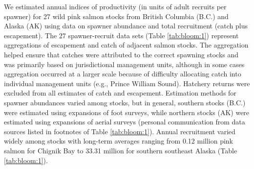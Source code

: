 We estimated annual indices of productivity (in units of adult recruits per
spawner) for 27 wild pink salmon stocks from British Columbia (B.C.) and Alaska
(AK) using data on spawner abundance and total recruitment (catch plus
escapement). The 27 spawner-recruit data sets (Table \ref{tab:bloom:1})
represent aggregations of escapement and catch of adjacent salmon stocks. The
aggregation helped ensure that catches were attributed to the correct spawning
stocks and was primarily based on jurisdictional management units, although in
some cases aggregation occurred at a larger scale because of difficulty
allocating catch into individual management units (e.g., Prince William Sound).
Hatchery returns were excluded from all estimates of catch and escapement.
Estimation methods for spawner abundances varied among stocks, but in general,
southern stocks (B.C.) were estimated using expansions of foot surveys, while
northern stocks (AK) were estimated using expansions of aerial surveys (personal
communication from data sources listed in footnotes of Table \ref{tab:bloom:1}).
Annual recruitment varied widely among stocks with long-term averages ranging
from 0.12 million pink salmon for Chignik Bay to 33.31 million for southern
southeast Alaska (Table \ref{tab:bloom:1}).

